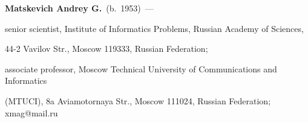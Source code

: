  \Contrl





 \noindent


\textbf{Matskevich Andrey G.}~(b.~1953)~---


 senior scientist, Institute of Informatics Problems, Russian Academy of Sciences,


 44-2 Vavilov Str., Moscow 119333, Russian Federation;


 associate professor, Moscow Technical University of Communications and Informatics


(MTUCI),  8a Aviamotornaya Str., Moscow 111024, Russian Federation;  xmag@mail.ru














 \label{end\stat}





 \renewcommand{\bibname}{\protect\rm Литература}


